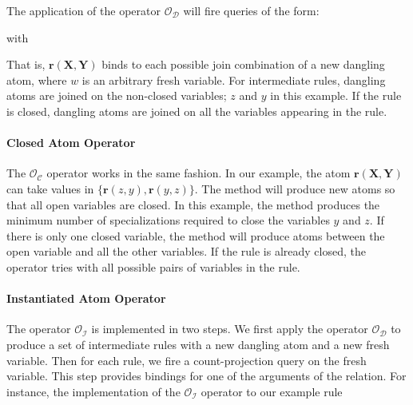 
\noindent
The application of the operator $\mathcal{O_D}$ will fire queries of the form:


\noindent with 

\noindent That is, $\bm{r}(\bm{X}, \bm{Y})$ binds to each possible join combination of a new dangling atom,
where $w$ is an arbitrary fresh variable. For intermediate rules, dangling atoms are joined on the non-closed variables; 
$z$ and $y$ in this example.
If the rule is closed, dangling atoms are joined on all the variables appearing in the rule.

\paragraph{Closed Atom Operator} The $\mathcal{O_C}$ operator works in the same fashion. In our example, the atom $\bm{r}(\bm{X}, \bm{Y})$ 
can take values in $\{ \bm{r}(z,y), \bm{r}(y,z) \}$. The method will produce new atoms so that all open variables are closed. In this example, the method produces the minimum number
of specializations required to close the variables $y$ and $z$. If there is only one closed variable, the method will produce atoms between
the open variable and all the other variables. If the rule is already closed, the operator tries with
all possible pairs of variables in the rule.

\paragraph{Instantiated Atom Operator} The operator $\mathcal{O_I}$ is implemented in two steps. 
We first apply the operator $\mathcal{O_D}$ to produce a set of intermediate rules 
with a new dangling atom and a new fresh variable.
Then for each rule, we fire a count-projection query on the fresh variable. 
This step provides bindings for one of the arguments of the relation.
For instance, the implementation of the $\mathcal{O_I}$ operator to our example 
rule 


